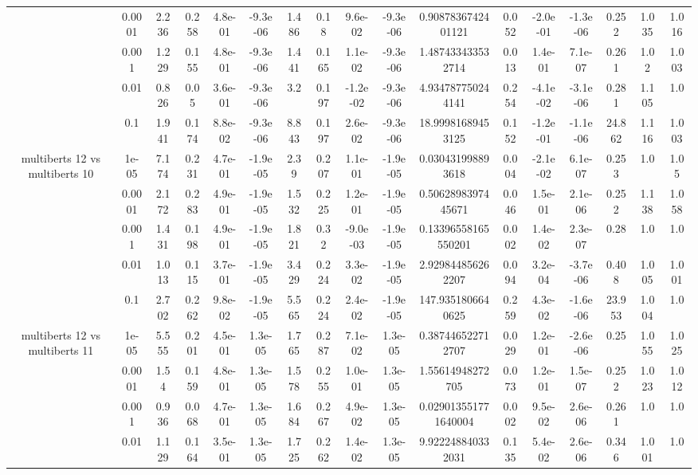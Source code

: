 \begin{tabular}{|c|c|c|c|c|c|c|c|c|c|c|c|c|c|c|c|c|}
 & 0.0001 & 2.236 & 0.258 & 4.8e-01 & -9.3e-06 & 1.486 & 0.18 & 9.6e-02 & -9.3e-06 & 0.9087836742401121 & 0.052 & -2.0e-01 & -1.3e-06 & 0.252 & 1.035 & 1.016 \\
 & 0.001 & 1.229 & 0.155 & 4.8e-01 & -9.3e-06 & 1.441 & 0.165 & 1.1e-02 & -9.3e-06 & 1.487433433532714 & 0.013 & 1.4e-01 & 7.1e-07 & 0.261 & 1.02 & 1.003 \\
 & 0.01 & 0.826 & 0.05 & 3.6e-01 & -9.3e-06 & 3.2 & 0.197 & -1.2e-02 & -9.3e-06 & 4.934787750244141 & 0.254 & -4.1e-02 & -3.1e-06 & 0.281 & 1.105 & 1.0 \\
 & 0.1 & 1.941 & 0.174 & 8.8e-02 & -9.3e-06 & 8.843 & 0.197 & 2.6e-02 & -9.3e-06 & 18.99981689453125 & 0.152 & -1.2e-01 & -1.1e-06 & 24.862 & 1.116 & 1.003 \\
\hline
\multirow{5}{*}{multiberts 12 vs multiberts 10} & 1e-05 & 7.174 & 0.231 & 4.7e-01 & -1.9e-05 & 2.39 & 0.207 & 1.1e-01 & -1.9e-05 & 0.030431998893618 & 0.004 & -2.1e-02 & 6.1e-07 & 0.253 & 1.0 & 1.05 \\
 & 0.0001 & 2.172 & 0.283 & 4.9e-01 & -1.9e-05 & 1.532 & 0.225 & 1.2e-01 & -1.9e-05 & 0.5062898397445671 & 0.046 & 1.5e-01 & 2.1e-06 & 0.252 & 1.138 & 1.058 \\
 & 0.001 & 1.431 & 0.198 & 4.9e-01 & -1.9e-05 & 1.821 & 0.32 & -9.0e-03 & -1.9e-05 & 0.13396558165550201 & 0.002 & 1.4e-02 & 2.3e-07 & 0.28 & 1.0 & 1.0 \\
 & 0.01 & 1.013 & 0.115 & 3.7e-01 & -1.9e-05 & 3.429 & 0.224 & 3.3e-02 & -1.9e-05 & 2.929844856262207 & 0.094 & 3.2e-04 & -3.7e-06 & 0.408 & 1.005 & 1.001 \\
 & 0.1 & 2.702 & 0.262 & 9.8e-02 & -1.9e-05 & 5.565 & 0.224 & 2.4e-02 & -1.9e-05 & 147.9351806640625 & 0.259 & 4.3e-02 & -1.6e-06 & 23.953 & 1.004 & 1.0 \\
\hline
\multirow{5}{*}{multiberts 12 vs multiberts 11} & 1e-05 & 5.555 & 0.201 & 4.5e-01 & 1.3e-05 & 1.765 & 0.287 & 7.1e-02 & 1.3e-05 & 0.387446522712707 & 0.029 & 1.2e-01 & -2.6e-06 & 0.25 & 1.055 & 1.025 \\
 & 0.0001 & 1.54 & 0.159 & 4.8e-01 & 1.3e-05 & 1.578 & 0.255 & 1.0e-01 & 1.3e-05 & 1.55614948272705 & 0.073 & 1.2e-01 & 1.5e-07 & 0.252 & 1.023 & 1.012 \\
 & 0.001 & 0.936 & 0.068 & 4.7e-01 & 1.3e-05 & 1.684 & 0.267 & 4.9e-02 & 1.3e-05 & 0.029013551771640004 & 0.002 & 9.5e-02 & 2.6e-06 & 0.261 & 1.0 & 1.0 \\
 & 0.01 & 1.129 & 0.164 & 3.5e-01 & 1.3e-05 & 1.725 & 0.262 & 1.4e-02 & 1.3e-05 & 9.922248840332031 & 0.135 & 5.4e-02 & 2.6e-06 & 0.346 & 1.001 & 1.0 \\

\end{tabular}
